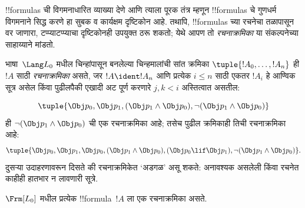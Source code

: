 \documentclass[../../../include/open-logic-section]{subfiles}
\begin{document}


!!{formula}s ची विगमनाधारित व्याख्या देणे आणि त्याला पूरक तंत्र म्हणून
!!{formula}s चे गुणधर्म विगमनाने सिद्ध करणे हा सुबक व कार्यक्षम
दृष्टिकोन आहे. तथापि, !!{formula}s च्या रचनेचा तळापासून वर जाणारा,
टप्प्याटप्प्याचा दृष्टिकोनही उपयुक्त ठरू शकतो; येथे आपण तो
\emph{रचनाक्रमिका} या संकल्पनेच्या साहाय्याने मांडतो.

\begin{defn}[सूत्रांसाठी रचनाक्रमिका]
भाषा~$\Lang L_0$ मधील चिन्हांपासून बनलेल्या चिन्हमालांची सांत क्रमिका
$\tuple{!A_0,\dotsc,!A_n}$ ही $!A$ साठी \emph{रचनाक्रमिका} असते, जर
$!A \ident !A_n$ आणि प्रत्येक $i \leq n$ साठी एकतर $!A_i$ हे आण्विक
सूत्र असेल किंवा पुढीलपैकी एखादी अट पूर्ण करणारे $j,k < i$ अस्तित्वात
असतील:
\begin{enumerate}
\end{enumerate}
\end{defn}

\begin{ex}
\[
\tuple{
    \Obj p_0,
    \Obj p_1,
    (\Obj p_1 \land \Obj p_0),
    \lnot (\Obj p_1 \land \Obj p_0)
}
\]
ही $\lnot (\Obj p_1 \land \Obj p_0)$ ची एक रचनाक्रमिका आहे; तसेच
पुढील क्रमिकाही तिची रचनाक्रमिका आहे:
\[
\tuple{
    \Obj p_0,
    \Obj p_1,
    \Obj p_0,
    (\Obj p_1 \land \Obj p_0),
    (\Obj p_0 \lif \Obj p_1),
    \lnot (\Obj p_1 \land \Obj p_0)
}.
\]
%
दुसऱ्या उदाहरणावरून दिसते की रचनाक्रमिकेत `अडगळ' असू शकते: अनावश्यक
असलेली किंवा रचनेत काहीही हातभार न लावणारी सूत्रे.
\end{ex}

\begin{prop}
$\Frm[L_0]$ मधील प्रत्येक !!{formula}~$!A$ ला एक रचनाक्रमिका असते.
\end{prop}
\end{document}

